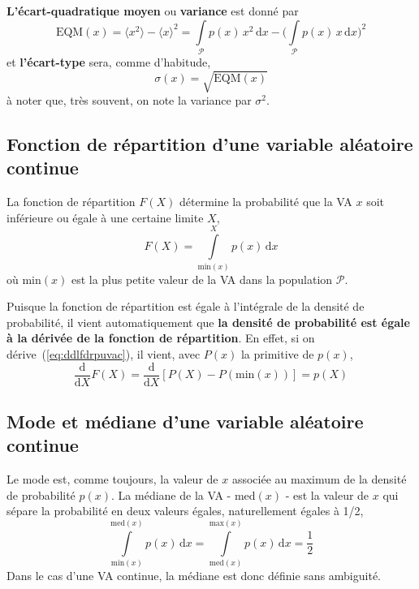 \textbf{L'écart-quadratique moyen} ou \textbf{variance} est donné par
\begin{equation}
\text{EQM}(x)=\langle x^2\rangle-\langle x\rangle^2=\int\limits_{\mathcal{P}}p(x)\,x^2\,\text{d}x-\Big(\int\limits_{\mathcal{P}}p(x)\,x\,\text{d}x\Big)^2
\end{equation}
et \textbf{l'écart-type} sera, comme d'habitude,
\begin{equation}
\sigma(x)=\sqrt{\text{EQM}(x)}
\end{equation}
à noter que, très souvent, on note la variance par $\sigma^2$.

\subsection{Fonction de répartition d'une variable aléatoire continue}

La fonction de répartition $F(X)$ détermine la probabilité que la VA $x$ soit inférieure ou égale à une certaine limite $X$,
\begin{equation}
F(X)=\int\limits_{\text{min}(x)}^X p(x)\,\text{d}x
\label{eq:ddlfdrpuvac}
\end{equation}
où $\text{min}(x)$ est la plus petite valeur de la VA dans la population $\mathcal{P}$.

Puisque la fonction de répartition est égale à l'intégrale de la densité de probabilité, il vient automatiquement que \textbf{la densité de probabilité est égale à la dérivée de la fonction de répartition}. En effet, si on dérive~(\ref{eq:ddlfdrpuvac}), il vient, avec $P(x)$ la primitive de $p(x)$,
$$
\frac{\text{d}}{\text{d}X}F(X)=
\frac{\text{d}}{\text{d}X}\left[P(X)-P(\text{min}(x))\right]=p(X)
$$

\subsection{Mode et médiane d'une variable aléatoire continue}

Le mode est, comme toujours, la valeur de $x$ associée au maximum de la densité de probabilité $p(x)$. La médiane de la VA - $\text{med}(x)$ - est la valeur de $x$ qui sépare la probabilité en deux valeurs égales, naturellement égales à 1/2,
\begin{equation}
\int\limits_{\text{min}(x)}^{\text{med}(x)} p(x)\,\text{d}x=
\int\limits_{\text{med}(x)}^{\text{max}(x)} p(x)\,\text{d}x=\frac{1}{2}
\end{equation}
Dans le cas d'une VA continue, la médiane est donc définie sans ambiguité.

